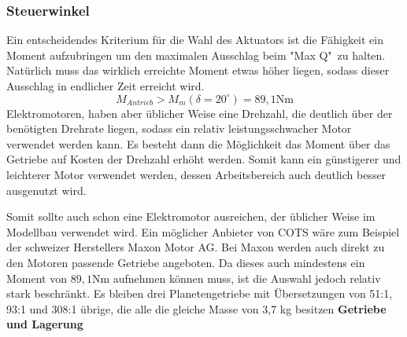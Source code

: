 \subsubsection{Steuerwinkel}
Ein entscheidendes Kriterium für die Wahl des Aktuators ist die Fähigkeit ein Moment aufzubringen um den maximalen Ausschlag beim "Max Q"\ zu halten. Natürlich muss das wirklich erreichte Moment etwas höher liegen, sodass dieser Ausschlag in endlicher Zeit erreicht wird.
\begin{equation}
	M_{Antrieb} > M_m(\delta = 20^\circ) = 89,1\mathrm{Nm}
\end{equation}
Elektromotoren, haben aber üblicher Weise eine Drehzahl, die deutlich über der benötigten Drehrate liegen, sodass ein relativ leistungsschwacher Motor verwendet werden kann. Es besteht dann die Möglichkeit das Moment über das Getriebe auf Kosten der Drehzahl erhöht werden. Somit kann ein günstigerer und leichterer Motor verwendet werden, dessen Arbeitsbereich auch deutlich besser ausgenutzt wird.

Somit sollte auch schon eine Elektromotor ausreichen, der üblicher Weise im Modellbau verwendet wird. Ein möglicher Anbieter von COTS wäre zum Beispiel der schweizer Herstellers Maxon Motor AG. Bei Maxon werden auch direkt zu den Motoren passende Getriebe angeboten. Da dieses auch mindestens ein Moment von $89,1\mathrm{Nm}$ aufnehmen können muss, ist die Auswahl jedoch relativ stark beschränkt. Es bleiben drei Planetengetriebe mit Übersetzungen von 51:1, 93:1 und 308:1 übrige, die alle die gleiche Masse von 3,7 kg besitzen
\textbf{Getriebe und Lagerung}

